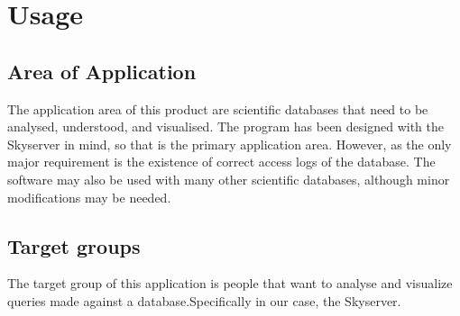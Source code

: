 \section{Usage}
\subsection{Area of Application}
The application area of this product are scientific databases that need to be analysed,
 understood, and visualised.
The program has been designed with the Skyserver in mind,
 so that is the primary application area.
However, as the only major requirement is the existence of correct access logs of the database.
The software may also be used with many other scientific databases,
 although minor modifications may be needed.


%



\subsection{Target groups}

The target group of this application is people that want to analyse 
and visualize queries made against a database.Specifically
in our case, the Skyserver.

